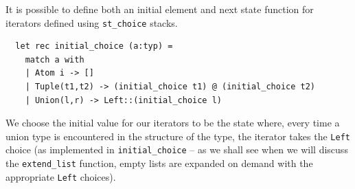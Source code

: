 \documentclass[a4paper,english]{lipics-v2019}
\begin{document}
It is possible to define both an initial element and next state function for
iterators defined using \verb|st_choice| stacks.

\begin{small}
\begin{verbatim}
  let rec initial_choice (a:typ) = 
    match a with
    | Atom i -> []
    | Tuple(t1,t2) -> (initial_choice t1) @ (initial_choice t2)
    | Union(l,r) -> Left::(initial_choice l)
\end{verbatim}
\end{small}
We choose the initial value for our iterators to be the state where, every
time a union type is encountered in the structure of the type, the iterator
takes the \verb+Left+ choice (as implemented in \verb|initial_choice|
-- as we shall see when we will discuss the \verb+extend_list+
function, empty lists are expanded on demand with the appropriate
\verb+Left+ choices).
\end{document}
